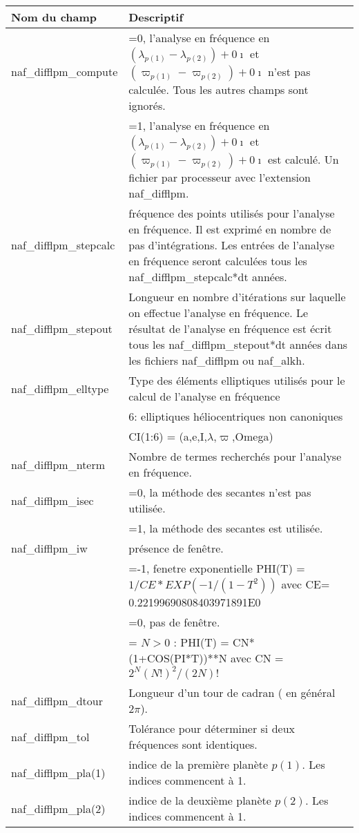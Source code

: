 \documentclass[11pt]{article}
\begin{document}
\begin{tabularx}{\textwidth}{|l|X|}
\hline
Nom du champ& Descriptif \\ \hline \hline
naf\_difflpm\_compute &=0, l'analyse en fr\'equence en $(\lambda_{p(1)}-\lambda_{p(2)})+0\imath$ et $(\varpi_{p(1)}-\varpi_{p(2)})+0\imath$ n'est pas calcul\'ee. Tous les autres champs sont ignor\'es.\\
&=1, l'analyse en fr\'equence en  $(\lambda_{p(1)}-\lambda_{p(2)})+0\imath$ et $(\varpi_{p(1)}-\varpi_{p(2)})+0\imath$ est calcul\'e. Un fichier par processeur avec l'extension naf\_difflpm.\\ \hline

naf\_difflpm\_stepcalc  & fr\'equence des points utilis\'es pour l'analyse en fr\'equence. Il est exprim\'e en nombre de pas d'int\'egrations. Les entr\'ees de l'analyse en fr\'equence seront calcul\'ees tous les naf\_difflpm\_stepcalc*dt ann\'ees. \\ \hline

naf\_difflpm\_stepout  & Longueur en nombre d'it\'erations sur laquelle on effectue l'analyse en fr\'equence. Le r\'esultat de l'analyse en fr\'equence est \'ecrit tous les naf\_difflpm\_stepout*dt ann\'ees dans les fichiers naf\_difflpm ou naf\_alkh.\\ \hline

naf\_difflpm\_elltype  & Type des \'el\'ements elliptiques utilis\'es pour le calcul de l'analyse en fr\'equence\\ 
&6:  elliptiques h\'eliocentriques non canoniques\\
&	     CI(1:6) = (a,e,I,$\lambda$,$\varpi$,Omega)\\ \hline
naf\_difflpm\_nterm  & Nombre de termes recherch\'es pour l'analyse en fr\'equence.\\ \hline
naf\_difflpm\_isec  & =0, la m\'ethode des secantes n'est pas utilis\'ee.\\
&=1, la m\'ethode des secantes est utilis\'ee.\\ \hline
naf\_difflpm\_iw  & pr\'esence de fen\^etre.\\
&=-1, fenetre exponentielle PHI(T) = $1/CE*EXP(-1/(1-T^2))$ avec CE= 0.22199690808403971891E0\\
&=0, pas de fen\^etre.\\
&= $N>0$ : PHI(T) = CN*(1+COS(PI*T))**N avec CN = $2^N(N!)^2/(2N)!$\\ \hline
naf\_difflpm\_dtour  & Longueur d'un tour de cadran ( en g\'en\'eral $2\pi$).\\ \hline
naf\_difflpm\_tol  &  Tol\'erance pour d\'eterminer si deux fr\'equences sont identiques.\\ \hline
naf\_difflpm\_pla(1)   & indice de la premi\`ere plan\`ete $p(1)$. Les indices commencent \`a 1.\\ \hline
naf\_difflpm\_pla(2)   & indice de la deuxi\`eme plan\`ete $p(2)$. Les indices commencent \`a  1.\\ \hline

 \end{tabularx}
\end{document}
